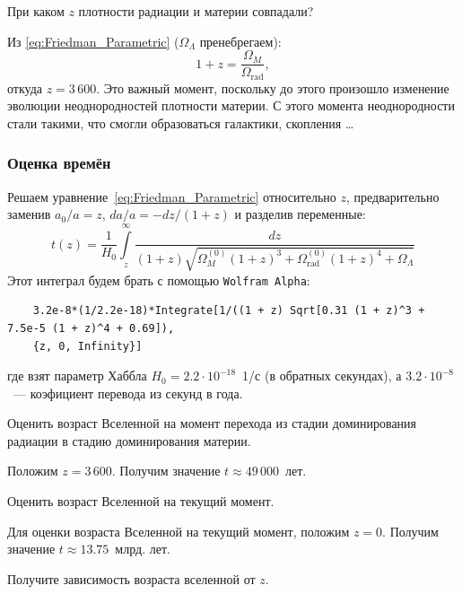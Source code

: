 \documentclass[]{article}
\begin{document}
\begin{tcolorbox}
	При каком $z$ плотности радиации и материи совпадали?
\end{tcolorbox}
Из \eqref{eq:Friedman_Parametric} ($\Omega_{\Lambda}$ пренебрегаем):
\begin{equation}\label{}
	1 + z = \frac{\Omega_{M}}{\Omega_\text{rad}},
\end{equation}
откуда $z = 3\,600$.
Это важный момент, поскольку до этого произошло изменение эволюции неоднородностей плотности материи. С этого момента неоднородности стали такими, что смогли образоваться галактики, скопления \ldots

\subsubsection{Оценка времён}

Решаем уравнение~\eqref{eq:Friedman_Parametric} относительно $z$, предварительно заменив $a_0/a = z$, $da/a = -dz/(1+z)$ и разделив переменные:
\begin{equation}\label{eq:tz}
 t(z) = \frac1{H_0}\int\limits_z^{\infty} \frac{dz}{(1+ z)\sqrt{\Omega_{M}^{(0)} (1 + z)^3 + \Omega_\text{rad}^{(0)}(1 + z)^4  + \Omega_{\Lambda}}}
\end{equation}
Этот интеграл будем брать с помощью \texttt{Wolfram Alpha}:
{\footnotesize
\begin{verbatim}
    3.2e-8*(1/2.2e-18)*Integrate[1/((1 + z) Sqrt[0.31 (1 + z)^3 + 7.5e-5 (1 + z)^4 + 0.69]),
    {z, 0, Infinity}]
\end{verbatim}
}
\noindent где взят параметр Хаббла $H_0 = 2.2\cdot 10^{-18}$~1/с (в обратных секундах), а $3.2\cdot 10^{-8}$~--- коэфициент перевода из секунд в года.

\begin{tcolorbox}
    Оценить возраст Вселенной на момент перехода из стадии доминирования радиации в стадию доминирования материи.
\end{tcolorbox}
Положим \href{https://bit.ly/2Zv1GKE}{$z = 3\,600$}. Получим значение $t \approx 49\,000 $~лет.

\begin{tcolorbox}
    Оценить возраст Вселенной на текущий момент.
\end{tcolorbox}
Для оценки возраста Вселенной на текущий момент, положим \href{https://bit.ly/32wa4uw}{$z = 0$}. Получим значение $t \approx 13.75 $~млрд. лет.

\begin{tcolorbox}
    Получите зависимость возраста вселенной от $z$.
\end{tcolorbox}
\end{document}
